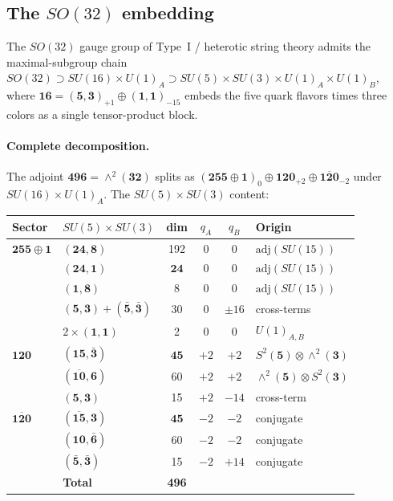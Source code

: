 \subsection{The $SO(32)$ embedding}

The $SO(32)$ gauge group of Type~I / heterotic string theory
admits the maximal-subgroup chain
$SO(32) \supset SU(16) \times U(1)_A
  \supset SU(5) \times SU(3) \times U(1)_A \times U(1)_B$,
where $\mathbf{16} = (\mathbf{5},\mathbf{3})_{+1}
  \oplus (\mathbf{1},\mathbf{1})_{-15}$
embeds the five quark flavors times three colors as a single
tensor-product block.

\paragraph{Complete decomposition.}
The adjoint $\mathbf{496} = \wedge^2(\mathbf{32})$ splits as
$(\mathbf{255}\!\oplus\!\mathbf{1})_{0}
  \oplus \mathbf{120}_{+2}
  \oplus \overline{\mathbf{120}}_{-2}$
under $SU(16) \times U(1)_A$.  The $SU(5) \times SU(3)$ content:

\begin{center}
\begin{tabular}{llcccl}
\toprule
Sector & $SU(5)\times SU(3)$ & dim & $q_A$ & $q_B$ & Origin \\
\midrule
$\mathbf{255}\!\oplus\!\mathbf{1}$
 & $(\mathbf{24},\mathbf{8})$ & 192 & 0 & 0
   & $\mathrm{adj}(SU(15))$ \\
 & $\boldsymbol{(24,1)}$ & $\boldsymbol{24}$ & 0 & 0
   & $\mathrm{adj}(SU(15))$ \\
 & $(\mathbf{1},\mathbf{8})$ & 8 & 0 & 0
   & $\mathrm{adj}(SU(15))$ \\
 & $(\mathbf{5},\mathbf{3})\!+\!(\bar{\mathbf{5}},\bar{\mathbf{3}})$
   & 30 & 0 & $\pm 16$ & cross-terms \\
 & $2\times(\mathbf{1},\mathbf{1})$ & 2 & 0 & 0
   & $U(1)_{A,B}$ \\
\midrule
$\mathbf{120}$
 & $\boldsymbol{(15,\bar{3})}$ & $\boldsymbol{45}$ & $+2$ & $+2$
   & $S^2(\mathbf{5})\otimes\wedge^2(\mathbf{3})$ \\
 & $(\overline{\mathbf{10}},\mathbf{6})$ & 60 & $+2$ & $+2$
   & $\wedge^2(\mathbf{5})\otimes S^2(\mathbf{3})$ \\
 & $(\mathbf{5},\mathbf{3})$ & 15 & $+2$ & $-14$
   & cross-term \\
\midrule
$\overline{\mathbf{120}}$
 & $\boldsymbol{(\overline{15},3)}$ & $\boldsymbol{45}$ & $-2$ & $-2$
   & conjugate \\
 & $(\mathbf{10},\bar{\mathbf{6}})$ & 60 & $-2$ & $-2$
   & conjugate \\
 & $(\bar{\mathbf{5}},\bar{\mathbf{3}})$ & 15 & $-2$ & $+14$
   & conjugate \\
\midrule
 & \textbf{Total} & \textbf{496} & & & \\
\bottomrule
\end{tabular}
\end{center}


